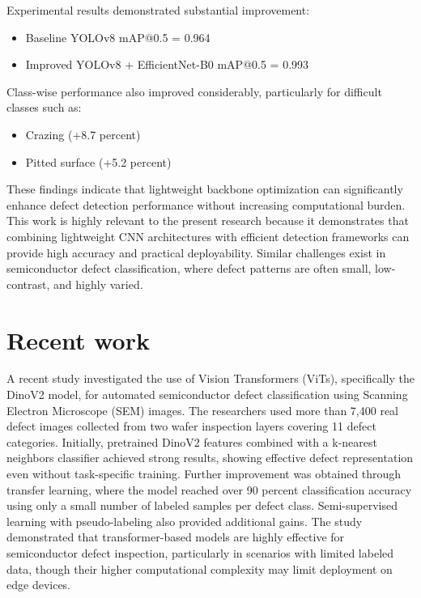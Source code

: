 Experimental results demonstrated substantial improvement:
\begin{itemize}
 \item Baseline YOLOv8 mAP@0.5 = 0.964
 \item Improved YOLOv8 + EfficientNet-B0 mAP@0.5 = 0.993
\end{itemize}
Class-wise performance also improved considerably, particularly for difficult classes such as:
\begin{itemize}
 \item Crazing (+8.7 percent)
 \item Pitted surface (+5.2 percent)
\end{itemize}

These findings indicate that lightweight backbone optimization can significantly enhance defect detection performance without increasing computational burden.
This work is highly relevant to the present research because it demonstrates that combining lightweight CNN architectures with efficient detection frameworks can provide high accuracy and practical deployability. Similar challenges exist in semiconductor defect classification, where defect patterns are often small, low-contrast, and highly varied.

\section{Recent work}
A recent study investigated the use of Vision Transformers (ViTs), specifically the DinoV2 model, for automated semiconductor defect classification using Scanning Electron Microscope (SEM) images. 
The researchers used more than 7,400 real defect images collected from two wafer inspection layers covering 11 defect categories. Initially, pretrained DinoV2 features combined with a k-nearest neighbors 
classifier achieved strong results, showing effective defect representation even without task-specific training. Further improvement was obtained through transfer learning, where the model reached over
 90 percent classification accuracy using only a small number of labeled samples per defect class. Semi-supervised learning with pseudo-labeling also provided additional gains. The study demonstrated that 
 transformer-based models are highly effective for semiconductor defect inspection, particularly in scenarios with limited labeled data, though their higher computational complexity may limit deployment 
 on edge devices.
